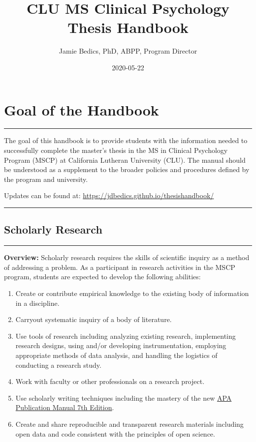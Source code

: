 \documentclass[openany]{book}
\title{CLU MS Clinical Psychology Thesis Handbook}
\author{Jamie Bedics, PhD, ABPP, Program Director}
\date{2020-05-22}
\providecommand{\tightlist}{%
  \setlength{\itemsep}{0pt}\setlength{\parskip}{0pt}}
\begin{document}
\maketitle

{
\setcounter{tocdepth}{1}
\tableofcontents
}
\hypertarget{goal-of-the-handbook}{%
\chapter{Goal of the Handbook}\label{goal-of-the-handbook}}

\begin{center}\rule{0.5\linewidth}{0.5pt}\end{center}

The goal of this handbook is to provide students with the information needed to successfully complete the master's thesis in the MS in Clinical Psychology Program (MSCP) at California Lutheran University (CLU). The manual should be understood as a supplement to the broader policies and procedures defined by the program and university.

Updates can be found at: \url{https://jdbedics.github.io/thesishandbook/}

\begin{center}\rule{0.5\linewidth}{0.5pt}\end{center}

\hypertarget{scholarly-research}{%
\section{Scholarly Research}\label{scholarly-research}}

\begin{center}\rule{0.5\linewidth}{0.5pt}\end{center}

\textbf{Overview:} Scholarly research requires the skills of scientific inquiry as a method of addressing a problem. As a participant in research activities in the MSCP program, students are expected to develop the following abilities:

\begin{enumerate}
\def\labelenumi{\arabic{enumi}.}
\tightlist
\item
  Create or contribute empirical knowledge to the existing body of information in a discipline.
\item
  Carryout systematic inquiry of a body of literature.
\item
  Use tools of research including analyzing existing research, implementing research designs, using and/or developing instrumentation, employing appropriate methods of data analysis, and handling the logistics of conducting a research study.
\item
  Work with faculty or other professionals on a research project.
\item
  Use scholarly writing techniques including the mastery of the new \href{https://apastyle.apa.org/products/publication-manual-7th-edition/}{APA Publication Manual 7th Edition}.
\item
  Create and share reproducible and transparent research materials including open data and code consistent with the principles of open science.
\end{enumerate}
\end{document}
